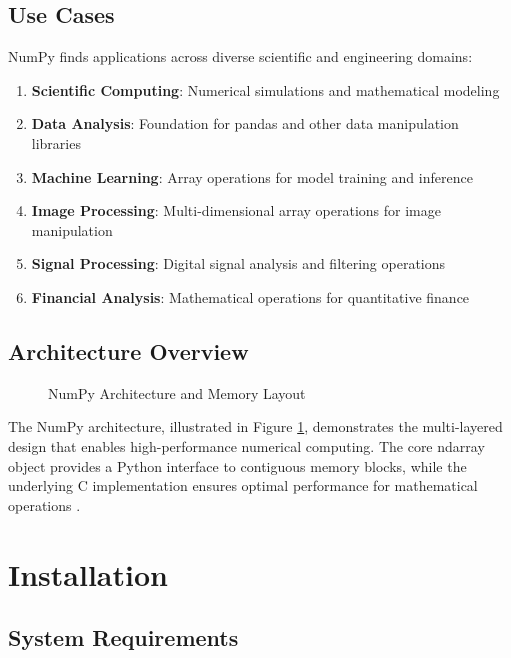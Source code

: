 \subsection{Use Cases}
\label{subsec:usecases}

NumPy finds applications across diverse scientific and engineering domains:

\begin{enumerate}
	\item \textbf{Scientific Computing}: Numerical simulations and mathematical modeling
	\item \textbf{Data Analysis}: Foundation for pandas and other data manipulation libraries
	\item \textbf{Machine Learning}: Array operations for model training and inference
	\item \textbf{Image Processing}: Multi-dimensional array operations for image manipulation
	\item \textbf{Signal Processing}: Digital signal analysis and filtering operations
	\item \textbf{Financial Analysis}: Mathematical operations for quantitative finance
\end{enumerate}

\subsection{Architecture Overview}
\label{subsec:architecture}

\begin{figure}[H]
	\centering
	
	\caption{NumPy Architecture and Memory Layout \cite{NumPy:2024}}
	\label{fig:numpy_architecture}
\end{figure}

The NumPy architecture, illustrated in Figure \ref{fig:numpy_architecture}, demonstrates the multi-layered design that enables high-performance numerical computing. The core ndarray object provides a Python interface to contiguous memory blocks, while the underlying C implementation ensures optimal performance for mathematical operations \cite{Harris:2020}.

\clearpage

\section{Installation}
\label{sec:installation}

\subsection{System Requirements}
\label{subsec:system_requirements}

